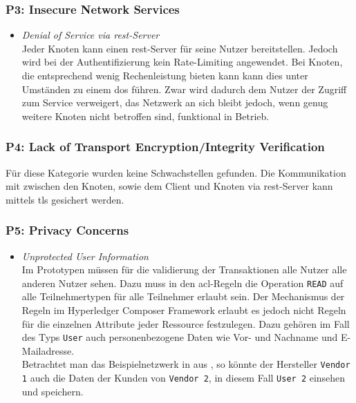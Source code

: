         \subsubsection*{P3: Insecure Network Services}
            \begin{itemize}[leftmargin=0cm,label={}]
                \item \emph{Denial of Service via \gls{rest}-Server}\label{vuln:prototype_dos}\\
        	        Jeder Knoten kann einen \gls{rest}-Server für seine Nutzer bereitstellen. 
        	        Jedoch wird bei der Authentifizierung kein Rate-Limiting angewendet. 
        	        Bei Knoten, die entsprechend wenig Rechenleistung bieten kann kann dies unter Umständen zu einem \gls{dos} führen. 
        	        Zwar wird dadurch dem Nutzer der Zugriff zum Service verweigert, das Netzwerk an sich bleibt jedoch, wenn genug weitere Knoten nicht betroffen sind, funktional in Betrieb.
            \end{itemize}
            
        \subsubsection*{P4: Lack of Transport Encryption/Integrity Verification}
            Für diese Kategorie wurden keine Schwachstellen gefunden. 
            Die Kommunikation mit zwischen den Knoten, sowie dem Client und Knoten via \gls{rest}-Server kann mittels \gls{tls} gesichert werden.
            
        \subsubsection*{P5: Privacy Concerns}
            \begin{itemize}[leftmargin=0cm,label={}]
                \item \emph{Unprotected User Information}\label{vuln:prototype_userdata}\\
                    Im Prototypen müssen für die validierung der Transaktionen alle Nutzer alle anderen Nutzer sehen. 
                    Dazu muss in den \gls{acl}-Regeln die Operation \colorbox{light-gray}{\lstinline{READ}} auf alle Teilnehmertypen für alle Teilnehmer erlaubt sein. 
                    Der Mechanismus der Regeln im Hyperledger Composer Framework erlaubt es jedoch nicht Regeln für die einzelnen Attribute jeder Ressource festzulegen. 
                    Dazu gehören im Fall des Typs \colorbox{light-gray}{\lstinline{User}} auch personenbezogene Daten wie Vor- und Nachname und E-Mailadresse.\\
                    Betrachtet man das Beispielnetzwerk in  aus , so könnte der Hersteller \colorbox{light-gray}{\lstinline{Vendor 1}} auch die Daten der Kunden von \colorbox{light-gray}{\lstinline{Vendor 2}}, in diesem Fall \colorbox{light-gray}{\lstinline{User 2}} einsehen und speichern.
            \end{itemize}
            
